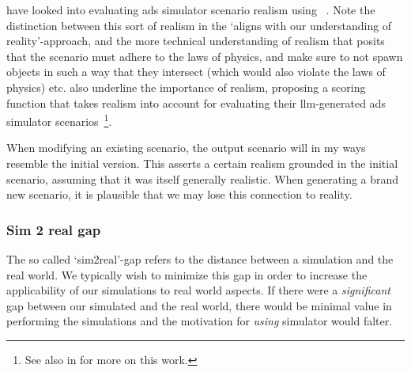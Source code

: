 \citeauthor{RealityBites} have looked into evaluating \acrshort{ads} simulator scenario realism
using ~\cite[40]{RealityBites}. Note the distinction between this sort of realism in
the `aligns with our understanding of reality'-approach, and the more technical understanding of
realism that posits that the scenario must adhere to the laws of physics, and make sure to not spawn
objects in such a way that they intersect (which would also violate the laws of physics) etc.
\citeauthor{LLMScenarioChang24} also underline the importance of realism, proposing a scoring
function that takes realism into account for evaluating their \acrshort{llm}-generated
\acrshort{ads} simulator scenarios~\cite[6581-6582]{LLMScenarioChang24}\footnote{See also
     in  for more on this work.}.

When modifying an existing scenario, the output scenario will in my ways resemble the initial
version. This asserts a certain realism grounded in the initial scenario, assuming that it was
itself generally realistic. When generating a brand new scenario, it is plausible that we may lose
this connection to reality.

\subsubsection{Sim 2 real gap}

The so called `sim2real'-gap refers to the distance between a simulation and the real world. We
typically wish to minimize this gap in order to increase the applicability of our simulations to
real world aspects. If there were a \emph{significant} gap between our simulated 
and the real world, there would be minimal value in performing the simulations and the motivation
for \emph{using} simulator would falter.







